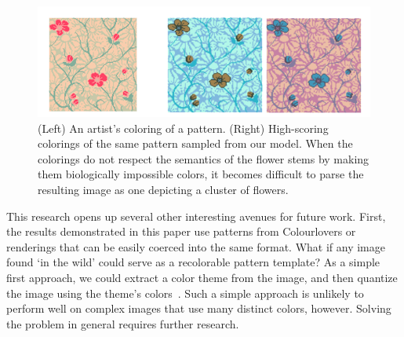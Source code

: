 

\begin{figure}
\centering
\includegraphics[width=0.7\columnwidth]{figs/badFlowers}
\caption{(Left) An artist's coloring of a pattern. (Right) High-scoring colorings of the same pattern sampled from our model. When the colorings do not respect the semantics of the flower stems by making them biologically impossible colors, it becomes difficult to parse the resulting image as one depicting a cluster of flowers.}
\label{fig:badFlowers}
\end{figure}


This research opens up several other interesting avenues for future work.
First, the results demonstrated in this paper use patterns from Colourlovers or renderings that can be easily coerced into the same format. What if any image found `in the wild' could serve as a recolorable pattern template? As a simple first approach, we could extract a color theme from the image, and then quantize the image using the theme's colors~\cite{SharonPaletteExtraction}. Such a simple approach is unlikely to perform well on complex images that use many distinct colors, however. Solving the problem in general requires further research.

